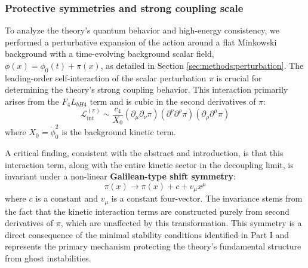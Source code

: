 \documentclass[twocolumn]{aastex631}
\begin{document}
\subsubsection{Protective symmetries and strong coupling scale}
To analyze the theory's quantum behavior and high-energy consistency, we performed a perturbative expansion of the action around a flat Minkowski background with a time-evolving background scalar field, $\phi(x) = \phi_0(t) + \pi(x)$, as detailed in Section \ref{sec:methods:perturbation}. The leading-order self-interaction of the scalar perturbation $\pi$ is crucial for determining the theory's strong coupling behavior. This interaction primarily arises from the $F_4 L_{bH4}$ term and is cubic in the second derivatives of $\pi$:
\begin{equation*}
\mathcal{L}_{\text{int}}^{(\pi)} \sim \frac{c_4}{X_0} (\partial_\mu \partial_\nu \pi) (\partial^\nu \partial^\rho \pi) (\partial_\rho \partial^\mu \pi)
\end{equation*}
where $X_0 = \dot{\phi}_0^2$ is the background kinetic term.

A critical finding, consistent with the abstract and introduction, is that this interaction term, along with the entire kinetic sector in the decoupling limit, is invariant under a non-linear \textbf{Galilean-type shift symmetry}:
\begin{equation*}
\pi(x) \rightarrow \pi(x) + c + v_\mu x^\mu
\end{equation*}
where $c$ is a constant and $v_\mu$ is a constant four-vector. The invariance stems from the fact that the kinetic interaction terms are constructed purely from second derivatives of $\pi$, which are unaffected by this transformation. This symmetry is a direct consequence of the minimal stability conditions identified in Part I and represents the primary mechanism protecting the theory's fundamental structure from ghost instabilities.
\end{document}
